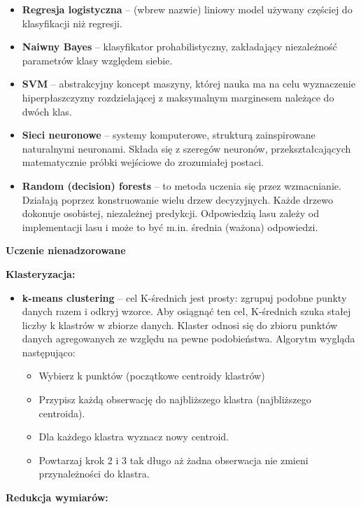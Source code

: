 \begin{itemize}
	\item \textbf{Regresja logistyczna} – (wbrew nazwie) liniowy model używany częściej do klasyfikacji niż regresji.
	\item \textbf{Naiwny Bayes} – klasyfikator prohabilistyczny, zakładający niezależność parametrów klasy względem siebie.
	\item \textbf{SVM} – abstrakcyjny koncept maszyny, której nauka ma na celu wyznaczenie hiperpłaszczyzny rozdzielającej z maksymalnym marginesem należące do dwóch klas.
	\item \textbf{Sieci neuronowe} – systemy komputerowe, strukturą zainspirowane naturalnymi neuronami. Składa się z szeregów neuronów, przekształcających matematycznie próbki wejściowe do zrozumiałej postaci.
	\item \textbf{Random (decision) forests} – to metoda uczenia się przez wzmacnianie. Działają poprzez konstruowanie wielu drzew decyzyjnych. Każde drzewo dokonuje osobistej, niezależnej predykcji. Odpowiedzią lasu zależy od implementacji lasu i może to być m.in. średnia (ważona) odpowiedzi.
\end{itemize}


\centerline{\textbf{Uczenie nienadzorowane}}

\textbf{Klasteryzacja:}\\

\begin{itemize}
	\item \textbf{k-means clustering} – cel K-średnich jest prosty: zgrupuj podobne punkty danych razem i odkryj wzorce. Aby osiągnąć ten cel, K-średnich szuka stałej liczby k klastrów w zbiorze danych. Klaster odnosi się do zbioru punktów danych agregowanych ze względu na pewne podobieństwa. Algorytm wygląda następująco:
	\begin{itemize}
		\item Wybierz k punktów (początkowe centroidy klastrów)
		\item Przypisz każdą obserwację do najbliższego klastra (najbliższego centroida).
		\item Dla każdego klastra wyznacz nowy centroid.
		\item Powtarzaj krok 2 i 3 tak długo aż żadna obserwacja nie zmieni przynależności do klastra.
	\end{itemize}
\end{itemize}

\textbf{Redukcja wymiarów:}\\

